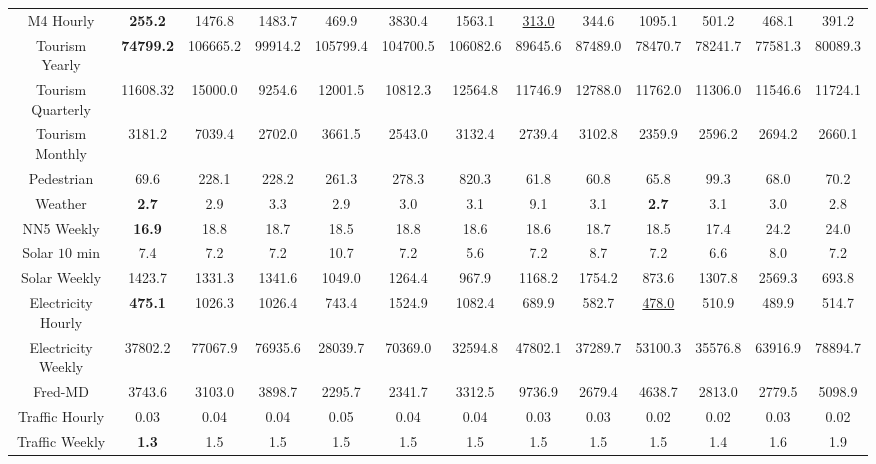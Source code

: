 \begin{table}
\begin{tabular}{c|c|cccccc|ccccc}
    M4 Hourly & \textbf{255.2} & 1476.8	&1483.7	&469.9&	3830.4&	1563.1&	\underline{313.0} &	344.6&	1095.1&	501.2&	468.1&	391.2\\
    
    Tourism Yearly & \textbf{74799.2}& 106665.2&	99914.2&	105799.4&	104700.5&	106082.6&	89645.6	&87489.0&	78470.7&	78241.7	&77581.3&	80089.3\\
    
    Tourism Quarterly & 11608.32& 15000.0&	9254.6&	12001.5	&10812.3	&12564.8	&11746.9	&12788.0	&11762.0&	11306.0	&11546.6	&11724.1 \\
    
    Tourism Monthly & 3181.2& 7039.4&	2702.0	&3661.5	&2543.0	&3132.4&	2739.4&	3102.8&	2359.9&	2596.2&	2694.2&	2660.1\\
    
    Pedestrian & 69.6& 228.1&	228.2	&261.3&	278.3&	820.3&	61.8&	60.8&	65.8&	99.3&	68.0&	70.2\\
    
    Weather & \textbf{2.7}& 2.9	&3.3&	2.9&	3.0&	3.1	&9.1&	3.1&	\textbf{2.7}	&3.1&	3.0	&2.8\\
    
    NN5 Weekly & \textbf{16.9}& 18.8&	18.7&	18.5&	18.8&	18.6&	18.6&	18.7&	18.5&	17.4&	24.2&	24.0 \\
    
    Solar $10$ min &7.4& 7.2&	7.2	&10.7&	7.2	&5.6&	7.2	&8.7&	7.2	&6.6&	8.0&	7.2\\
    
    Solar Weekly &1423.7& 1331.3&	1341.6&	1049.0&	1264.4&	967.9&	1168.2&	1754.2&	873.6&	1307.8&	2569.3&	693.8\\
    
    Electricity Hourly & \textbf{475.1} & 1026.3&	1026.4&	743.4&	1524.9&	1082.4&	689.9&	582.7&	\underline{478.0} &	510.9&	489.9&	514.7\\
    
    Electricity Weekly &37802.2& 77067.9&	76935.6&	28039.7	&70369.0&	32594.8&	47802.1&	37289.7	&53100.3&	35576.8	&63916.9&	78894.7\\
    
    Fred-MD &3743.6& 3103.0&	3898.7&	2295.7&	2341.7	&3312.5&	9736.9&	2679.4&	4638.7&	2813.0&	2779.5&	5098.9\\
    
    Traffic Hourly &0.03& 0.04&	0.04	&0.05&	0.04	&0.04&	0.03	&0.03&	0.02&	0.02	&0.03&	0.02\\
    
    Traffic Weekly &\textbf{1.3}& 1.5&	1.5	&1.5&	1.5	&1.5&	1.5&	1.5	&1.5&	1.4	&1.6&	1.9\\
    

\end{tabular}
\end{table}
